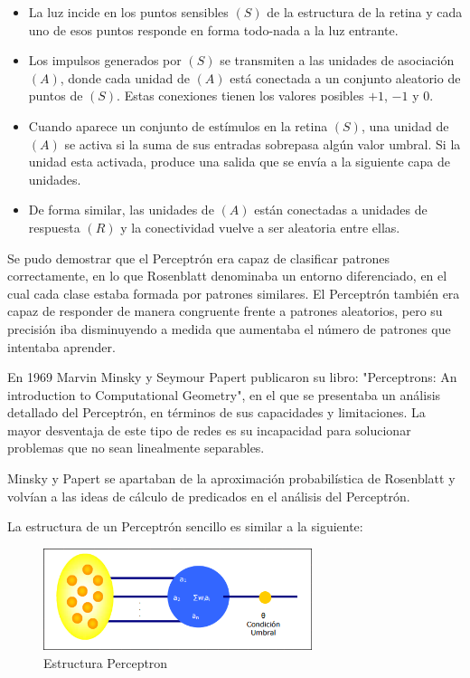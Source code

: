 \documentclass[a4paper, 11pt]{article} %
\begin{document}
\begin{itemize}
    \item La luz incide en los puntos sensibles $(S)$ de la estructura de la retina y cada uno de esos puntos responde en forma todo-nada a la luz entrante.
    \item Los impulsos generados por $(S)$ se transmiten a las unidades de asociación $(A)$, donde cada unidad de $(A)$ está conectada a un conjunto aleatorio de puntos de $(S)$. Estas conexiones tienen los valores posibles $+1$, $-1$ y $0$.
    \item Cuando aparece un conjunto de estímulos en la retina $(S)$, una unidad de $(A)$ se activa si la suma de sus entradas sobrepasa algún valor umbral. Si la unidad esta activada, produce una salida que se envía a la siguiente capa de unidades.
    \item De forma similar, las unidades de $(A)$ están conectadas a unidades de respuesta $(R)$ y la conectividad vuelve a ser aleatoria entre ellas.
\end{itemize}

Se pudo demostrar que el Perceptrón era capaz de clasificar patrones correctamente, en lo que Rosenblatt denominaba un entorno diferenciado, en el cual cada clase estaba formada por patrones similares. El Perceptrón también era capaz de responder de manera congruente frente a patrones aleatorios, pero su precisión iba disminuyendo a medida que aumentaba el número de patrones que intentaba aprender.

En 1969 Marvin Minsky y Seymour Papert publicaron su libro: "Perceptrons: An introduction to Computational Geometry", en el que se presentaba un análisis detallado del Perceptrón, en términos de sus capacidades y limitaciones. La mayor desventaja de este tipo de redes es su incapacidad para solucionar problemas que no sean linealmente separables.

Minsky y Papert se apartaban de la aproximación probabilística de Rosenblatt y volvían a las ideas de cálculo de predicados en el análisis del Perceptrón.

La estructura de un Perceptrón sencillo es similar a la siguiente:

\begin{figure}[H]
\centering
\includegraphics[width=0.7\textwidth]{Perceptron.PNG}
\caption{Estructura Perceptron}
\label{Estructura Perceptron}
\end{figure}
\end{document}
